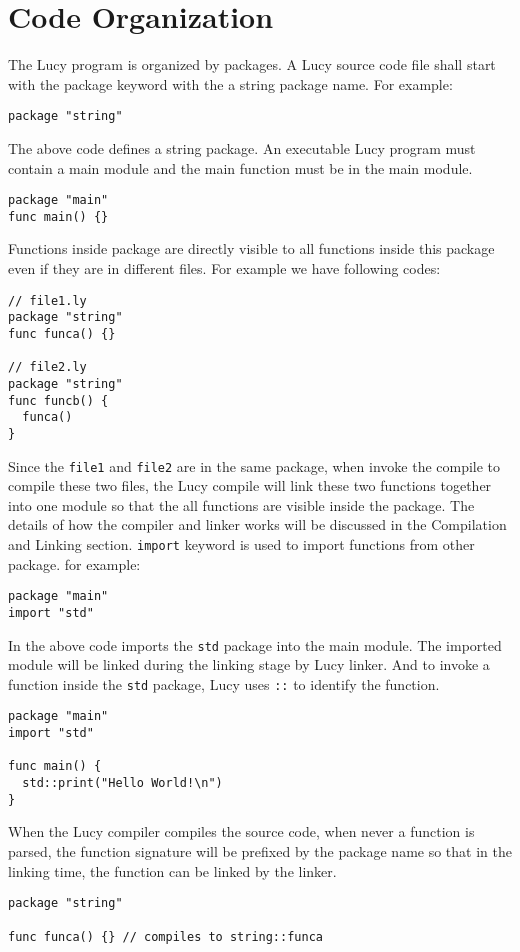 \section{Code Organization}
The Lucy program is organized by packages. A Lucy source code file shall start with the package keyword with the a string package name. For example:
\begin{lstlisting}
package "string"
\end{lstlisting}
The above code defines a string package. An executable Lucy program must contain a main module and the main function must be in the main module.
\begin{lstlisting}
package "main"
func main() {}
\end{lstlisting}
Functions inside package are directly visible to all functions inside this package even if they are in different files. For example we have following codes:
\begin{lstlisting}
// file1.ly
package "string"
func funca() {}

// file2.ly
package "string"
func funcb() {
  funca()
}
\end{lstlisting}
Since the \texttt{file1} and \texttt{file2} are in the same package, when invoke the compile to compile these two files, the Lucy compile will link these two functions together into one module so that the all functions are visible inside the package. The details of how the compiler and linker works will be discussed in the Compilation and Linking section.
\texttt{import} keyword is used to import functions from other package. for example:
\begin{lstlisting}
package "main"
import "std"
\end{lstlisting}
In the above code imports the \texttt{std} package into the main module. The imported module will be linked during the linking stage by Lucy linker. And to invoke a function inside the \texttt{std} package, Lucy uses \texttt{::} to identify the function.
\begin{lstlisting}
package "main"
import "std"

func main() {
  std::print("Hello World!\n")
}
\end{lstlisting}
When the Lucy compiler compiles the source code, when never a function is parsed, the function signature will be prefixed by the package name so that in the linking time, the function can be linked by the linker.
\begin{lstlisting}
package "string"

func funca() {} // compiles to string::funca
\end{lstlisting}
